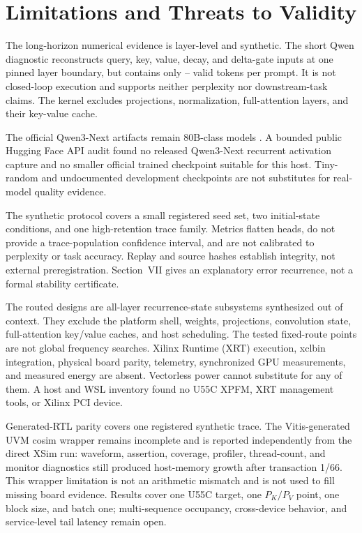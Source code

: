 \documentclass[conference]{IEEEtran}
\begin{document}
\section{Limitations and Threats to Validity}
The long-horizon numerical evidence is layer-level and synthetic. The short
Qwen diagnostic reconstructs query, key, value, decay, and delta-gate inputs
at one pinned layer boundary, but contains only
\CorrectedQwenRecurrentMinTokens{}--\CorrectedQwenRecurrentMaxTokens{} valid
tokens per prompt. It is not closed-loop execution and supports neither
perplexity nor downstream-task claims. The kernel excludes projections,
normalization, full-attention layers, and their key-value cache.

The official Qwen3-Next artifacts remain 80B-class models
\cite{qwen3nextmodel}. A bounded public Hugging Face API audit found no released
Qwen3-Next recurrent activation capture and no smaller official trained
checkpoint suitable for this host. Tiny-random and undocumented development
checkpoints are not substitutes for real-model quality evidence.

The synthetic protocol covers a small registered seed set, two initial-state
conditions, and one high-retention trace family. Metrics flatten heads, do not
provide a trace-population confidence interval, and are not calibrated to
perplexity or task accuracy. Replay and source hashes establish integrity, not
external preregistration. Section~VII gives an explanatory error recurrence,
not a formal stability certificate.

The routed designs are all-layer recurrence-state subsystems synthesized out of
context. They exclude the platform shell, weights, projections, convolution
state, full-attention key/value caches, and host scheduling. The tested
fixed-route points are not global frequency searches. Xilinx Runtime (XRT)
execution, xclbin
integration, physical board parity, telemetry, synchronized GPU measurements,
and measured energy are absent. Vectorless power cannot substitute for any of
them. A host and WSL inventory found no U55C XPFM, XRT management tools, or
Xilinx PCI device.

Generated-RTL parity covers one registered synthetic trace. The Vitis-generated
UVM cosim wrapper remains incomplete and is reported independently from the
direct XSim run: waveform, assertion, coverage, profiler, thread-count, and
monitor diagnostics still produced host-memory growth after transaction 1/66.
This wrapper limitation is not an arithmetic mismatch and is not used to fill
missing board evidence. Results cover one U55C target,
one $P_K/P_V$ point, one block size, and batch one; multi-sequence occupancy,
cross-device behavior, and service-level tail latency remain open.
\end{document}
